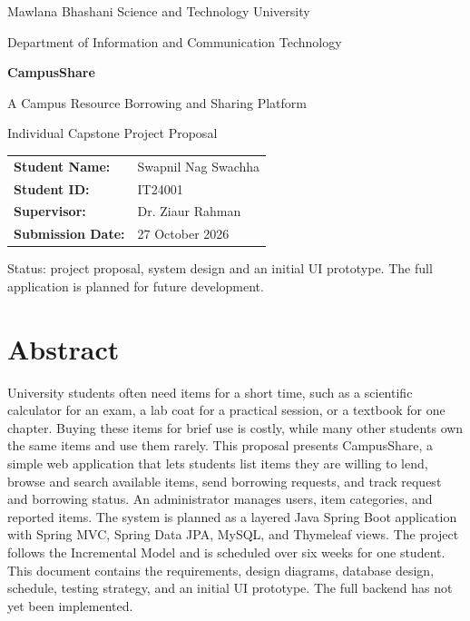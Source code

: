 \documentclass[11pt,a4paper]{article}
\newcommand{\studentname}{Swapnil Nag Swachha}
\newcommand{\studentid}{IT24001}
\newcommand{\university}{Mawlana Bhashani Science and Technology University}
\newcommand{\department}{Department of Information and Communication Technology}
\newcommand{\instructor}{Dr. Ziaur Rahman}
\newcommand{\submissiondate}{27 October 2026}
\begin{document}
\begin{titlepage}
\centering
\vspace*{1.5cm}
{\large \university\par}
\vspace{4pt}
{\large \department\par}
\vspace{2cm}
{\Huge\bfseries CampusShare\par}
\vspace{8pt}
{\Large A Campus Resource Borrowing and Sharing Platform\par}
\vspace{1.2cm}
{\large Individual Capstone Project Proposal\par}
\vspace{2.5cm}
\begin{tabular}{ll}
\textbf{Student Name:} & \studentname\\[4pt]
\textbf{Student ID:} & \studentid\\[4pt]
\textbf{Supervisor:} & \instructor\\[4pt]
\textbf{Submission Date:} & \submissiondate\\
\end{tabular}
\vfill
{\small Status: project proposal, system design and an initial UI prototype. The full application is planned for future development.\par}
\end{titlepage}

\tableofcontents
\newpage

\section*{Abstract}
University students often need items for a short time, such as a scientific calculator for an exam, a lab coat for a practical session, or a textbook for one chapter. Buying these items for brief use is costly, while many other students own the same items and use them rarely. This proposal presents CampusShare, a simple web application that lets students list items they are willing to lend, browse and search available items, send borrowing requests, and track request and borrowing status. An administrator manages users, item categories, and reported items. The system is planned as a layered Java Spring Boot application with Spring MVC, Spring Data JPA, MySQL, and Thymeleaf views. The project follows the Incremental Model and is scheduled over six weeks for one student. This document contains the requirements, design diagrams, database design, schedule, testing strategy, and an initial UI prototype. The full backend has not yet been implemented.
\end{document}
